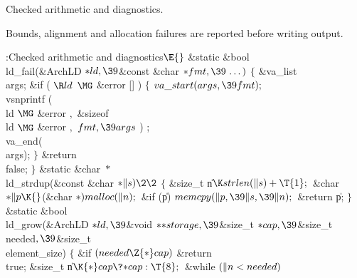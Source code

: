 Checked arithmetic and diagnostics.

Bounds, alignment and allocation failures are reported before writing output.

\Y\B\4:Checked arithmetic and diagnostics\X${}\E{}$\6
\1\1\&{static} \&{bool} \\{ld\_fail}(\&{ArchLD} ${}{*}\\{ld},\39{}$\&{const} %
\&{char} ${}{*}\\{fmt},\39\,\ldots\,)$ $\{$ \&{va\_list} \\{args}; \&{if} ( $\R%
\\{ld}$ $\MG$ \&{error} [] ) $\{$ $\\{va\_start}(\\{args},\39\\{fmt});$ %
\\{vsnprintf} ( \\{ld} $\MG$ \&{error} $,$ \&{sizeof} \\{ld} $\MG$ \&{error}
$,$ $\\{fmt},\39\\{args}$ )  ;\6
\\{va\_end}(\\{args}); $\}$ \&{return} \\{false}; $\}$ \1\1\&{static} \&{char}
${}{*}{}$\\{ld\_strdup}(\&{const} \&{char} ${}{*}\|s)\2\2{}$\6
${}\{{}$\1\6
\&{size\_t} \|n${}\K\\{strlen}(\|s)+\T{1};{}$\6
\&{char} ${}{*}\|p\K{}$(\&{char} ${}{*})\,\\{malloc}(\|n);{}$\7
\&{if} (\|p)\1\5
${}\\{memcpy}(\|p,\39\|s,\39\|n);{}$\2\6
\&{return} \|p;\6
\4${}\}{}$\2\7
\1\1\&{static} \&{bool} \\{ld\_grow}(\&{ArchLD} ${}{*}\\{ld},\39{}$\&{void}
${}{*}{*}\\{storage},\39{}$\&{size\_t} ${}{*}\\{cap},\39{}$\&{size\_t} %
\\{needed}${},\39{}$\&{size\_t} \\{element\_size})\2\2\6
${}\{{}$\1\6
\&{if} ${}(\\{needed}\Z{*}\\{cap}){}$\1\5
\&{return} \\{true};\2\7
\&{size\_t} \|n${}\K{*}\\{cap}\?{*}\\{cap}:\T{8};{}$\7
\&{while} ${}(\|n<\\{needed}){}$\5
